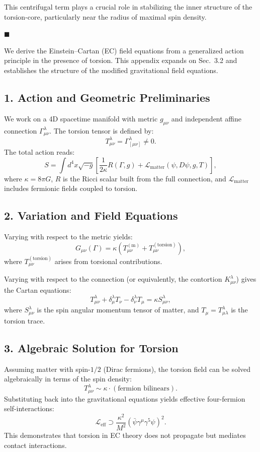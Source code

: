 \documentclass{article}
\begin{document}
This centrifugal term plays a crucial role in stabilizing the inner structure of the torsion-core, particularly near the radius of maximal spin density.

\hfill $\blacksquare$


\noindent
We derive the Einstein--Cartan (EC) field equations from a generalized action principle in the presence of torsion. This appendix expands on Sec.~3.2 and establishes the structure of the modified gravitational field equations.

\subsection*{1. Action and Geometric Preliminaries}
We work on a 4D spacetime manifold with metric $g_{\mu\nu}$ and independent affine connection $\Gamma^{\lambda}_{\mu\nu}$. The torsion tensor is defined by:
\[
T^{\lambda}_{\mu\nu} = \Gamma^{\lambda}_{[\mu\nu]} \neq 0.
\]
The total action reads:
\[
S = \int d^4x \sqrt{-g} \left[ \frac{1}{2\kappa} R(\Gamma, g) + \mathcal{L}_\text{matter}(\psi, D\psi, g, T) \right],
\]
where $\kappa = 8\pi G$, $R$ is the Ricci scalar built from the full connection, and $\mathcal{L}_\text{matter}$ includes fermionic fields coupled to torsion.

\subsection*{2. Variation and Field Equations}
Varying with respect to the metric yields:
\[
G_{\mu\nu}(\Gamma) = \kappa \left(T_{\mu\nu}^{(\text{m})} + T_{\mu\nu}^{(\text{torsion})}\right),
\]
where $T_{\mu\nu}^{(\text{torsion})}$ arises from torsional contributions.

Varying with respect to the connection (or equivalently, the contortion $K^{\lambda}_{\mu\nu}$) gives the Cartan equations:
\[
T^{\lambda}_{\mu\nu} + \delta^{\lambda}_{\mu} T_{\nu} - \delta^{\lambda}_{\nu} T_{\mu} = \kappa S^{\lambda}_{\mu\nu},
\]
where $S^{\lambda}_{\mu\nu}$ is the spin angular momentum tensor of matter, and $T_\mu = T^{\lambda}_{\mu\lambda}$ is the torsion trace.

\subsection*{3. Algebraic Solution for Torsion}
Assuming matter with spin-$1/2$ (Dirac fermions), the torsion field can be solved algebraically in terms of the spin density:
\[
T^{\lambda}_{\mu\nu} \sim \kappa \cdot (\text{fermion bilinears}).
\]
Substituting back into the gravitational equations yields effective four-fermion self-interactions:
\[
\mathcal{L}_\text{eff} \supset \frac{\kappa^2}{M^2} (\bar{\psi} \gamma^\mu \gamma^5 \psi)^2.
\]
This demonstrates that torsion in EC theory does not propagate but mediates contact interactions.
\end{document}
